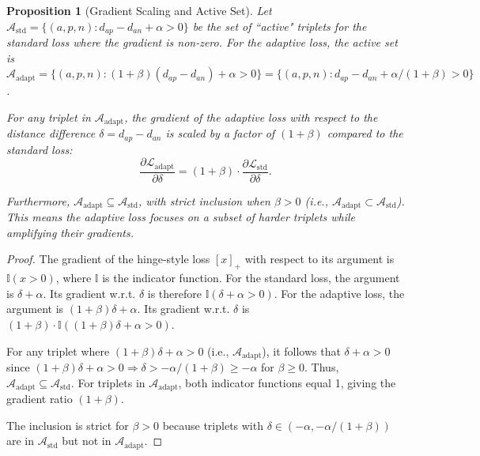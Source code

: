 \documentclass[pdflatex,sn-mathphys-num]{sn-jnl}%
\theoremstyle{thmstyleone}%
\newtheorem{proposition}{Proposition}%
\theoremstyle{thmstyletwo}%
\theoremstyle{thmstylethree}%
\theoremstyle{plain} %
\theoremstyle{definition} %
\theoremstyle{remark} %
\theoremstyle{plain} %
\begin{document}
\begin{proposition}[Gradient Scaling and Active Set]
\label{prop:gradient_properties}
Let $\mathcal{A}_{\text{std}} = \{(a,p,n) : d_{ap} - d_{an} + \alpha > 0\}$ be the set of ``active" triplets for the standard loss where the gradient is non-zero. For the adaptive loss, the active set is $\mathcal{A}_{\text{adapt}} = \{(a,p,n) : (1+\beta)(d_{ap} - d_{an}) + \alpha > 0\} = \{(a,p,n) : d_{ap} - d_{an} + \alpha/(1+\beta) > 0\}$. 

For any triplet in $\mathcal{A}_{\text{adapt}}$, the gradient of the adaptive loss with respect to the distance difference $\delta = d_{ap} - d_{an}$ is scaled by a factor of $(1+\beta)$ compared to the standard loss:
\begin{equation}
    \frac{\partial \mathcal{L}_{\text{adapt}}}{\partial \delta} = (1+\beta) \cdot \frac{\partial \mathcal{L}_{\text{std}}}{\partial \delta}.
\end{equation}

Furthermore, $\mathcal{A}_{\text{adapt}} \subseteq \mathcal{A}_{\text{std}}$, with strict inclusion when $\beta > 0$ (i.e., $\mathcal{A}_{\text{adapt}} \subset \mathcal{A}_{\text{std}}$). This means the adaptive loss focuses on a subset of harder triplets while amplifying their gradients.
\end{proposition}

\begin{proof}
The gradient of the hinge-style loss $[x]_+$ with respect to its argument is $\mathbb{I}(x > 0)$, where $\mathbb{I}$ is the indicator function. For the standard loss, the argument is $\delta + \alpha$. Its gradient w.r.t. $\delta$ is therefore $\mathbb{I}(\delta + \alpha > 0)$. For the adaptive loss, the argument is $(1+\beta)\delta + \alpha$. Its gradient w.r.t. $\delta$ is $(1+\beta) \cdot \mathbb{I}((1+\beta)\delta + \alpha > 0)$.

For any triplet where $(1+\beta)\delta + \alpha > 0$ (i.e., $\mathcal{A}_{\text{adapt}}$), it follows that $\delta + \alpha > 0$ since $(1+\beta)\delta + \alpha > 0 \Rightarrow \delta > -\alpha/(1+\beta) \geq -\alpha$ for $\beta \geq 0$. Thus, $\mathcal{A}_{\text{adapt}} \subseteq \mathcal{A}_{\text{std}}$. For triplets in $\mathcal{A}_{\text{adapt}}$, both indicator functions equal 1, giving the gradient ratio $(1+\beta)$.

The inclusion is strict for $\beta>0$ because triplets with $\delta \in (-\alpha, -\alpha/(1+\beta))$ are in $\mathcal{A}_{\text{std}}$ but not in $\mathcal{A}_{\text{adapt}}$.
\end{proof}
\end{document}
